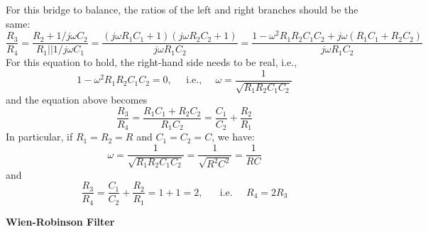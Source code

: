 
For this bridge to balance, the ratios of the left and right branches
should be the same:
\[
\frac{R_3}{R_4}=\frac{R_2+1/j\omega C_2}{R_1||1/j\omega C_1}
=\frac{(j\omega R_1C_1+1)(j\omega R_2C_2+1)}{j\omega R_1C_2}
=\frac{1-\omega^2R_1R_2C_1C_2+j\omega(R_1C_1+R_2C_2)}{j\omega R_1C_2}
\]
For this equation to hold, the right-hand side needs to be real, i.e.,
\[
1-\omega^2R_1R_2C_1C_2=0,\;\;\;\;\;\mbox{i.e.,}\;\;\;\;\;
\omega=\frac{1}{\sqrt{R_1R_2C_1C_2}}
\]
and the equation above becomes
\[
\frac{R_3}{R_4}=\frac{R_1C_1+R_2C_2}{R_1C_2}=\frac{C_1}{C_2}+\frac{R_2}{R_1}
\]
In particular, if $R_1=R_2=R$ and $C_1=C_2=C$, we have:
\[
\omega=\frac{1}{\sqrt{R_1R_2C_1C_2}}
=\frac{1}{\sqrt{R^2C^2}}=\frac{1}{RC}
\]
and
\[
\frac{R_3}{R_4}=\frac{C_1}{C_2}+\frac{R_2}{R_1}=1+1=2,
\;\;\;\;\;\;\mbox{i.e.}\;\;\;\;\;R_4=2R_3
\]


{\bf Wien-Robinson Filter}


